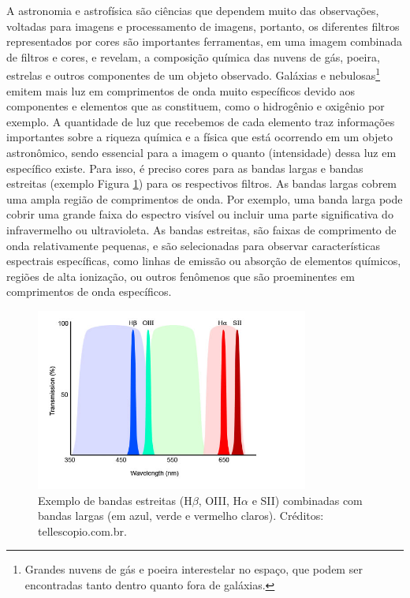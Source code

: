 A astronomia e astrofísica são ciências que dependem muito das observações, voltadas para imagens e processamento de imagens, portanto, os diferentes filtros representados por cores são importantes ferramentas, em uma imagem combinada de filtros e cores, e revelam, a composição química das nuvens de gás, poeira, estrelas e outros componentes de um objeto observado. Galáxias e nebulosas\footnote{Grandes nuvens de gás e poeira interestelar no espaço, que podem ser encontradas tanto dentro quanto fora de galáxias.} emitem mais luz em comprimentos de onda muito específicos devido aos componentes e elementos que as constituem, como o hidrogênio e oxigênio por exemplo. A quantidade de luz que recebemos de cada elemento traz informações importantes sobre a riqueza química e a física que está ocorrendo em um objeto astronômico, sendo essencial para a imagem o quanto (intensidade) dessa luz em específico existe. Para isso, é preciso cores para as bandas largas e bandas estreitas (exemplo Figura \ref{fig:narrowbandandbroadband}) para os respectivos filtros. As bandas largas cobrem uma ampla região de comprimentos de onda. Por exemplo, uma banda larga pode cobrir uma grande faixa do espectro visível ou incluir uma parte significativa do infravermelho ou ultravioleta. As bandas estreitas, são faixas de comprimento de onda relativamente pequenas, e são selecionadas para observar características espectrais específicas, como linhas de emissão ou absorção de elementos químicos, regiões de alta ionização, ou outros fenômenos que são proeminentes em comprimentos de onda específicos.
 
  \begin{figure}[h]
    \centering 
    \includegraphics[width=0.8\textwidth]{Imagens/narrowbandandbroadband.jpg} 
    \caption[Exemplo de bandas estreitas combinadas com bandas largas.]{Exemplo de bandas estreitas (H$\beta$, OIII, H$\alpha$
    e SII) combinadas com bandas largas (em azul, verde e vermelho claros). Créditos: tellescopio.com.br.}
    \label{fig:narrowbandandbroadband} 
  \end{figure}

